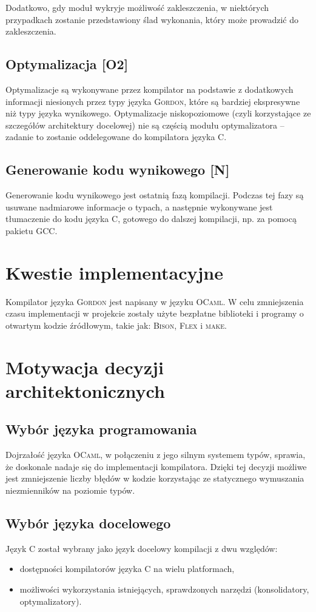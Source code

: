 \documentclass{documentation}
\begin{document}
Dodatkowo, gdy moduł wykryje możliwość zakleszczenia, w niektórych przypadkach
zostanie przedstawiony ślad wykonania, który może prowadzić do zakleszczenia. 

\subsection{Optymalizacja [O2]}
\noindent Optymalizacje są wykonywane przez kompilator na podstawie z
dodatkowych informacji niesionych przez typy języka \textsc{Gordon}, które są
bardziej ekspresywne niż typy języka wynikowego. Optymalizacje niskopoziomowe
(czyli korzystające ze szczegółów architektury docelowej) nie są częścią modułu
optymalizatora -- zadanie to zostanie oddelegowane do kompilatora języka
\textsc{C}.

\subsection{Generowanie kodu wynikowego [N]}
\noindent Generowanie kodu wynikowego jest ostatnią fazą kompilacji. Podczas tej
fazy są usuwane
nadmiarowe informacje o typach, a następnie wykonywane jest tłumaczenie do kodu języka
\textsc{C}, gotowego do dalszej kompilacji, np. za pomocą pakietu \textsc{GCC}.

\section{Kwestie implementacyjne}
\noindent Kompilator języka \textsc{Gordon} jest napisany w języku \textsc{OCaml}. W celu
zmniejszenia czasu implementacji w projekcie zostały użyte bezpłatne biblioteki i programy o otwartym
kodzie źródłowym, takie jak: \textsc{Bison}, \textsc{Flex} i \textsc{make}.

\section{Motywacja decyzji architektonicznych}
\subsection{Wybór języka programowania}
\noindent Dojrzałość języka \textsc{OCaml}, w połączeniu z jego silnym systemem typów,
sprawia, że doskonale nadaje się do implementacji kompilatora. Dzięki tej
decyzji możliwe jest zmniejszenie liczby błędów w kodzie korzystając ze
statycznego wymuszania niezmienników na poziomie typów.

\subsection{Wybór języka docelowego}
\noindent Język \textsc{C} został wybrany jako język docelowy kompilacji z dwu względów:
\begin{itemize}
    \item dostępności kompilatorów języka \textsc{C} na wielu platformach,
    \item możliwości wykorzystania istniejących, sprawdzonych narzędzi (konsolidatory,
        optymalizatory).
\end{itemize}
\end{document}
